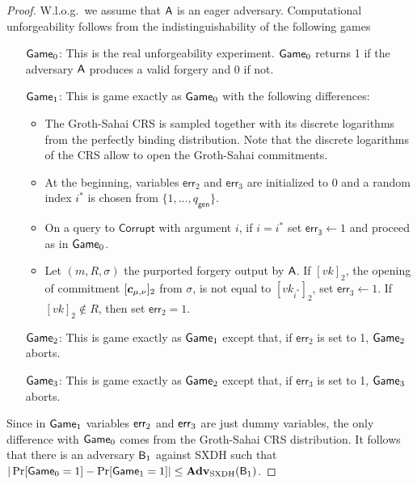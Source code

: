 \begin{proof}
W.l.o.g.~we assume that $\mathsf{A}$ is an eager adversary. Computational unforgeability follows from the indistinguishability of the following games
\begin{itemize}
\item[$\mathsf{Game}_0$:] This is the real unforgeability experiment. $\mathsf{Game}_0$ returns 1 if the adversary $\mathsf{A}$ produces a valid forgery and 0 if not.
\item[$\mathsf{Game}_1$:] This is game exactly as $\mathsf{Game}_0$ with the following differences: 
    \begin{itemize}
    \item The Groth-Sahai CRS is sampled together with its discrete logarithms from the perfectly binding distribution. Note that the discrete logarithms of the CRS allow to open the Groth-Sahai commitments.
    \item At the beginning, variables $\mathsf{err}_2$ and $\mathsf{err}_3$ are initialized to $0$ and a random index $i^*$ is chosen from $\{1,\ldots, q_\mathsf{gen}\}$.
    \item On a query to $\mathsf{Corrupt}$ with argument $i$, if $i=i^*$ set $\mathsf{err_3}\gets 1$ and proceed as in $\mathsf{Game}_0$.
    \item Let $(m,R,\sigma)$ the purported forgery output by $\mathsf{A}$. If $[vk]_2$, the opening of commitment $[{\boldsymbol{c}}_{\mu,\nu}]_2$ from $\sigma$, is not equal to $[vk_{i^*}]_2$,  set $\mathsf{err}_3\gets 1$. If $[vk]_2\notin R$, then set $\mathsf{err}_2=1$.
    \end{itemize}
\item[$\mathsf{Game}_2$:] This is game exactly as $\mathsf{Game}_1$ except that, if $\mathsf{err}_2$ is set to 1, $\mathsf{Game}_2$ aborts.
\item[$\mathsf{Game}_3$:] This is game exactly as $\mathsf{Game}_2$ except that, if $\mathsf{err}_3$ is set to 1, $\mathsf{Game}_3$ aborts. 
\end{itemize}
Since in $\mathsf{Game}_1$ variables $\mathsf{err}_2$ and $\mathsf{err}_3$ are just dummy variables, the only difference with $\mathsf{Game}_0$ comes from the Groth-Sahai CRS distribution. It follows that there is an adversary $\mathsf{B}_{1}$ against SXDH such that $|\Pr[\mathsf{Game}_0=1]-\Pr[\mathsf{Game}_1=1]|\leq \mathbf{Adv}_{\mathrm{SXDH}}(\mathsf{B}_{1})$.


\end{proof}
